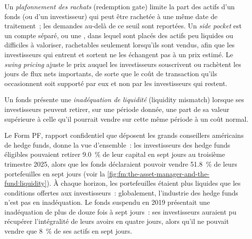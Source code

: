 \begin{definition}\label{def:fm:the-asset-manager-and-the-fund:gate}
Un \emph{plafonnement des rachats} (redemption gate) limite la part des actifs d'un fonds (ou d'un investisseur) qui peut être rachetée à une même date de traitement~;
les demandes au-delà de ce seuil sont reportées. Un \emph{side pocket} est un compte séparé, ou une , dans lequel sont placés des actifs peu liquides ou
difficiles à valoriser, rachetables seulement lorsqu'ils sont vendus, afin que les investisseurs qui entrent et sortent ne les échangent pas à un prix estimé.
Le \emph{swing pricing} ajuste le prix auquel les investisseurs souscrivent ou rachètent les jours de flux nets importants, de sorte que le
coût de transaction qu'ils occasionnent soit supporté par eux et non par les investisseurs qui restent.
\end{definition}

\begin{definition}\label{def:fm:the-asset-manager-and-the-fund:mismatch}
Un fonds présente une \emph{inadéquation de liquidité} (liquidity mismatch) lorsque ses investisseurs peuvent retirer, sur une période donnée, une part de sa valeur supérieure
à celle qu'il pourrait vendre sur cette même période à un coût normal.
\end{definition}

Le Form PF, rapport confidentiel que déposent les grands conseillers américains de hedge funds, donne la vue d'ensemble~: les investisseurs des hedge funds éligibles pouvaient
retirer 9.0~\% de leur capital en sept jours au troisième trimestre 2025, alors que les fonds déclaraient pouvoir vendre 51.8~\% de leurs
portefeuilles en sept jours (voir la \cref{fig:fm:the-asset-manager-and-the-fund:liquidity}). À chaque horizon, les portefeuilles étaient plus liquides que les
conditions offertes aux investisseurs~: globalement, l'industrie des hedge funds n'est pas en inadéquation. Le fonds suspendu en 2019 présentait une inadéquation de plus de douze fois
à sept jours~: ses investisseurs auraient pu récupérer l'intégralité de leurs avoirs en quatre jours, alors qu'il ne pouvait vendre que 8~\% de ses actifs en sept jours.

